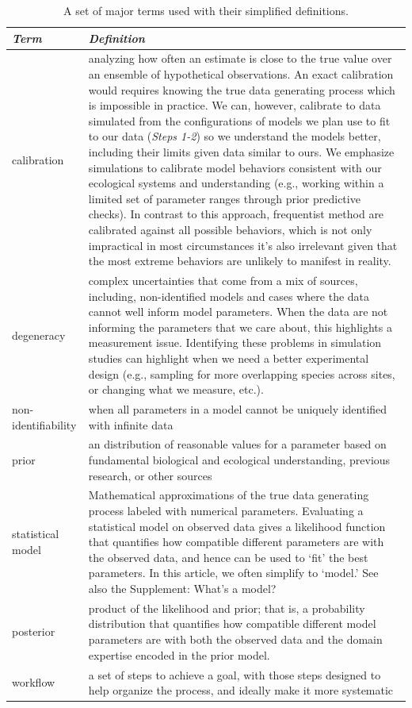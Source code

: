\documentclass[11pt]{article}
\begin{document}
\begin{table}
\caption{A set of major terms used with their simplified definitions.}
\begin{tabular}{ p{3 cm}  p{13 cm} }  \hline \hline
 \emph{Term}   & \emph{Definition}\\ 
\hline \hline
calibration & analyzing how often an estimate is close to the true value over an ensemble of hypothetical observations.  An exact calibration would requires knowing the true data generating process which is impossible in practice.  We can, however, calibrate to data simulated from the configurations of models we plan use to fit to our data (\emph{Steps 1-2}) so we understand the models better, including their limits given data similar to ours. We emphasize simulations to calibrate model behaviors consistent with our ecological systems and understanding (e.g., working within a limited set of parameter ranges through prior predictive checks). In contrast to this approach, frequentist method are calibrated against all possible behaviors, which is not only impractical in most circumstances it’s also irrelevant given that the most extreme behaviors are unlikely to manifest in reality. \\\hline
degeneracy & complex uncertainties that come from a mix of sources, including, non-identified models and cases where the data cannot well inform model parameters. When the data are not informing the parameters that we care about, this highlights a measurement issue. Identifying these problems in simulation studies can highlight when we need a better experimental design (e.g., sampling for more overlapping species across sites, or changing what we measure, etc.).  \\\hline
non-identifiability & when all parameters in a model cannot be uniquely identified with infinite data \\\hline
prior & an distribution of reasonable values for a parameter based on fundamental biological and ecological understanding, previous research, or other sources \\\hline
statistical model & Mathematical approximations of the true data generating process labeled with numerical parameters.  Evaluating a statistical model on observed data gives a likelihood function that quantifies how compatible different parameters are with the observed data, and hence can be used to `fit' the best parameters. In this article, we often simplify to `model.' See also the Supplement: What's a model? \\\hline
posterior & product of the likelihood and prior; that is, a probability distribution that quantifies how compatible different model parameters are with both the observed data and the domain expertise encoded in the prior model. \\\hline
workflow & a set of steps to achieve a goal, with those steps designed to help organize the process, and ideally make it more systematic  \\\hline
\hline
\end{tabular}
\label{tab:glossary}
\end{table}
\end{document}
